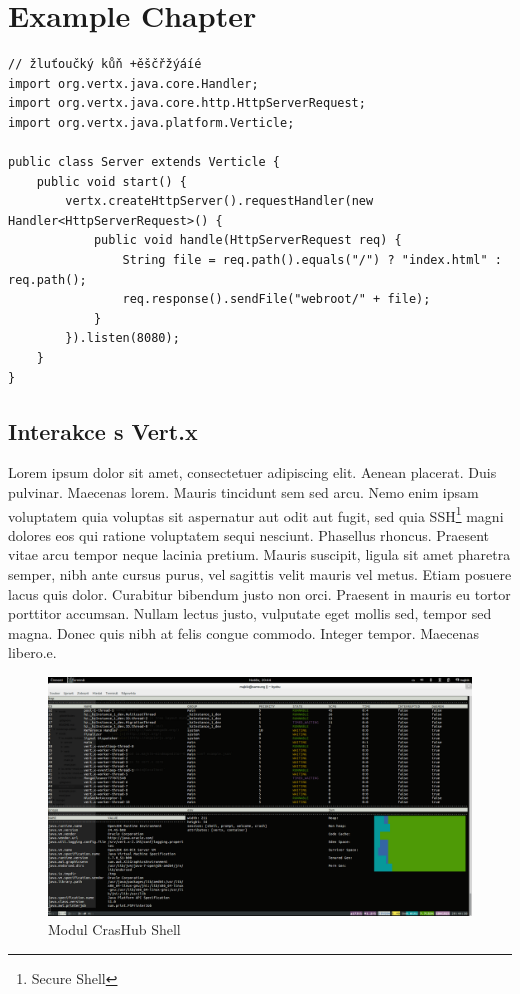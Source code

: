 
\chapter{Example Chapter}


\begin{lstlisting}[caption=Some Java code with UTF-8 comments]
// žluťoučký kůň +ěščřžýáíé
import org.vertx.java.core.Handler;
import org.vertx.java.core.http.HttpServerRequest;
import org.vertx.java.platform.Verticle;

public class Server extends Verticle {
    public void start() {
        vertx.createHttpServer().requestHandler(new Handler<HttpServerRequest>() {
            public void handle(HttpServerRequest req) {
                String file = req.path().equals("/") ? "index.html" : req.path();
                req.response().sendFile("webroot/" + file);
            }
        }).listen(8080);
    }
}
\end{lstlisting}

\section{Interakce s Vert.x}\label{sub:interaction}

Lorem ipsum dolor sit amet, consectetuer adipiscing elit. Aenean placerat. Duis pulvinar. Maecenas lorem. Mauris tincidunt sem sed arcu. Nemo enim ipsam voluptatem quia voluptas sit aspernatur aut odit aut fugit, sed quia SSH\footnote{Secure Shell} magni dolores eos qui ratione voluptatem sequi nesciunt. Phasellus rhoncus. Praesent vitae arcu tempor neque lacinia pretium. Mauris suscipit, ligula sit amet pharetra semper, nibh ante cursus purus, vel sagittis velit mauris vel metus. Etiam posuere lacus quis dolor. Curabitur bibendum justo non orci. Praesent in mauris eu tortor porttitor accumsan. Nullam lectus justo, vulputate eget mollis sed, tempor sed magna. Donec quis nibh at felis congue commodo. Integer tempor. Maecenas libero.e.
\begin{figure}[h]
\begin{centering}
\includegraphics[scale=0.21]{images/real_interaction}
\par\end{centering}
\caption{Modul CrasHub Shell\label{fig:real_interaction}}
\end{figure}
